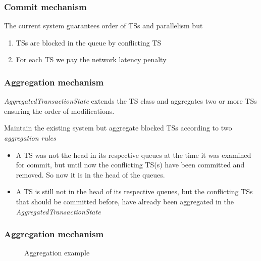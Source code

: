 \documentclass{beamer}
\begin{document}
\begin{frame}
\frametitle{Commit mechanism}

The current system guarantees order of TSs and parallelism but

\begin{enumerate}
\item TSs are blocked in the queue by conflicting TS
\item For each TS we pay the network latency penalty
\end{enumerate}
\end{frame}

\begin{frame}
\frametitle{Aggregation mechanism}
\emph{AggregatedTransactionState} extends the TS class and aggregates
two or more TSs ensuring the order of modifications.

Maintain the existing system but aggregate blocked TSs according to
two \emph{aggregation rules}

\begin{itemize}
\item<+-> A TS was not the head in its respective queues at the time
  it was examined for commit, but until now the conflicting TS(s) have
  been committed and removed. So now it is in the head of the queues.

\item<+-> A TS is still not in the head of its respective queues, but
  the conflicting TSs that should be committed before, have already
  been aggregated in the \emph{AggregatedTransactionState}
\end{itemize}
\end{frame}

\begin{frame}
\frametitle{Aggregation mechanism}

\begin{figure}
\centering
{}

\caption{Aggregation example}
\end{figure}
\end{frame}
\end{document}
